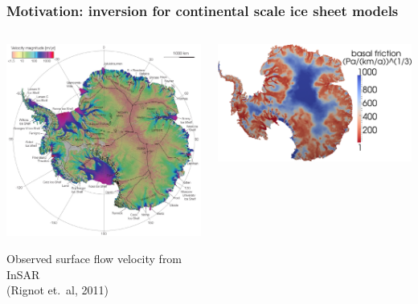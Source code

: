 \documentclass[10pt,final,xcolor=dvipsnames,aspect ratio=169]{beamer}
\begin{document}
\begin{frame}
	\frametitle{Motivation: inversion for continental scale ice sheet models}
	
	\vspace{0.2in}
	\begin{columns}
		\begin{column}{0.47\paperwidth}
			\centering\includegraphics[width=0.7\columnwidth]{extraplots/ScienceRignot-crop.pdf}
			\vspace{-0.1in}
			\begin{center}
				{\scriptsize Observed surface flow velocity from InSAR \\
					\vspace{-0.05in}
					(Rignot et.\ al, 2011)}
			\end{center}
		\end{column}
		\hspace{-0.4in}
		\begin{column}{0.51\paperwidth}
			\vspace{0.15in}
			
			\centering\includegraphics[width=0.8\columnwidth]{extraplots/beta_cube_cut.png}
			

\end{column}
\end{columns}
\end{frame}
\end{document}
